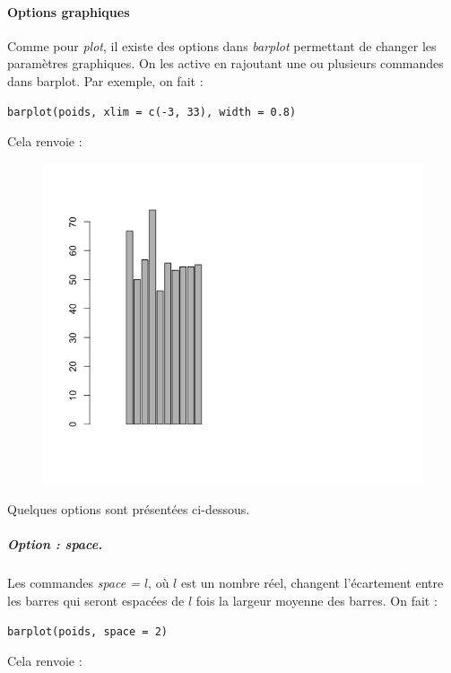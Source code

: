 \paragraph{Options graphiques}
Comme pour \textit{plot}, il existe des options dans \textit{barplot} permettant de changer les paramètres graphiques. On les active en rajoutant une ou plusieurs commandes dans barplot.\newline
Par exemple, on fait :
\begin{lstlisting}[language=html]
barplot(poids, xlim = c(-3, 33), width = 0.8)
\end{lstlisting}
Cela renvoie :
\begin{figure}[H]\begin{center}\includegraphics[scale=0.4]{ilu/gra33.png}\end{center}\end{figure}
Quelques options sont présentées ci-dessous.
\subparagraph{Option : space.} Les commandes \textit{space = $l$}, où $l$ est un nombre réel, changent l'écartement entre les barres qui seront espacées de $l$ fois la largeur moyenne des barres.\newline
On fait :
\begin{lstlisting}[language=html]
barplot(poids, space = 2)
\end{lstlisting}
Cela renvoie :
